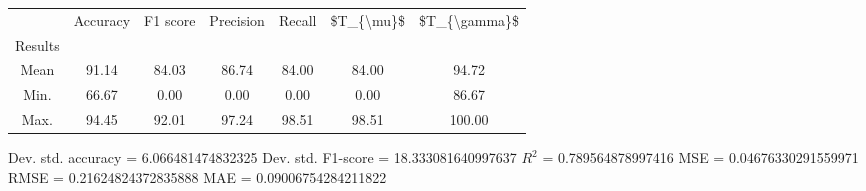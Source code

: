 \begin{tabular}{|c|c|c|c|c|c|c|}
\toprule
{} &  Accuracy &  F1 score &  Precision &  Recall &  \$T\_\{\textbackslash mu\}\$ &  \$T\_\{\textbackslash gamma\}\$ \\
Results &           &           &            &         &            &               \\
\hline
Mean    &     91.14 &     84.03 &      86.74 &   84.00 &      84.00 &         94.72 \\
Min.    &     66.67 &      0.00 &       0.00 &    0.00 &       0.00 &         86.67 \\
Max.    &     94.45 &     92.01 &      97.24 &   98.51 &      98.51 &        100.00 \\
\bottomrule
\end{tabular}

 Dev. std. accuracy = 6.066481474832325
 Dev. std. F1-score = 18.333081640997637
 $R^2$ = 0.789564878997416
 MSE = 0.04676330291559971
 RMSE = 0.21624824372835888
 MAE = 0.09006754284211822